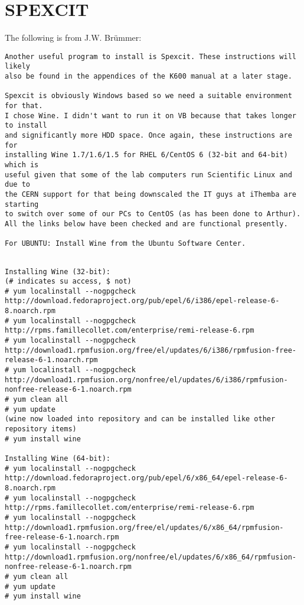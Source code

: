 \documentclass[11pt]{report}
\begin{document}
\section{SPEXCIT}

The following is from J.W. Br\"ummer:

\begin{verbatim}
Another useful program to install is Spexcit. These instructions will likely 
also be found in the appendices of the K600 manual at a later stage.

Spexcit is obviously Windows based so we need a suitable environment for that. 
I chose Wine. I didn't want to run it on VB because that takes longer to install 
and significantly more HDD space. Once again, these instructions are for 
installing Wine 1.7/1.6/1.5 for RHEL 6/CentOS 6 (32-bit and 64-bit) which is 
useful given that some of the lab computers run Scientific Linux and due to 
the CERN support for that being downscaled the IT guys at iThemba are starting 
to switch over some of our PCs to CentOS (as has been done to Arthur). 
All the links below have been checked and are functional presently.

For UBUNTU: Install Wine from the Ubuntu Software Center.
\end{verbatim} 

{\tiny 
\begin{verbatim}

Installing Wine (32-bit):
(# indicates su access, $ not)
# yum localinstall --nogpgcheck http://download.fedoraproject.org/pub/epel/6/i386/epel-release-6-8.noarch.rpm
# yum localinstall --nogpgcheck http://rpms.famillecollet.com/enterprise/remi-release-6.rpm
# yum localinstall --nogpgcheck http://download1.rpmfusion.org/free/el/updates/6/i386/rpmfusion-free-release-6-1.noarch.rpm
# yum localinstall --nogpgcheck http://download1.rpmfusion.org/nonfree/el/updates/6/i386/rpmfusion-nonfree-release-6-1.noarch.rpm
# yum clean all
# yum update
(wine now loaded into repository and can be installed like other repository items)
# yum install wine

Installing Wine (64-bit):
# yum localinstall --nogpgcheck http://download.fedoraproject.org/pub/epel/6/x86_64/epel-release-6-8.noarch.rpm
# yum localinstall --nogpgcheck http://rpms.famillecollet.com/enterprise/remi-release-6.rpm
# yum localinstall --nogpgcheck http://download1.rpmfusion.org/free/el/updates/6/x86_64/rpmfusion-free-release-6-1.noarch.rpm
# yum localinstall --nogpgcheck http://download1.rpmfusion.org/nonfree/el/updates/6/x86_64/rpmfusion-nonfree-release-6-1.noarch.rpm
# yum clean all
# yum update
# yum install wine
\end{verbatim}
} 
\end{document}
